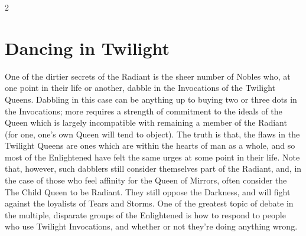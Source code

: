 \begin{multicols}{2}
\bigsidebarstart



\section*{Dancing in Twilight}

One of the dirtier secrets of the Radiant is the sheer number of Nobles who, at one point in their life or another, dabble in the Invocations of the Twilight Queens. Dabbling in this case can be anything up to buying two or three dots in the Invocations; more requires a strength of commitment to the ideals of the Queen which is largely incompatible with remaining a member of the Radiant (for one, one's own Queen will tend to object). The truth is that, the flaws in the Twilight Queens are ones which are within the hearts of man as a whole, and so most of the Enlightened have felt the same urges at some point in their life. Note that, however, such dabblers still consider themselves part of the Radiant, and, in the case of those who feel affinity for the Queen of Mirrors, often consider the The Child Queen to be Radiant. They still oppose the Darkness, and will fight against the loyalists of Tears and Storms. One of the greatest topic of debate in the multiple, disparate groups of the Enlightened is how to 
respond to people who use Twilight Invocations, and whether or not they're doing anything wrong.




\end{multicols}
